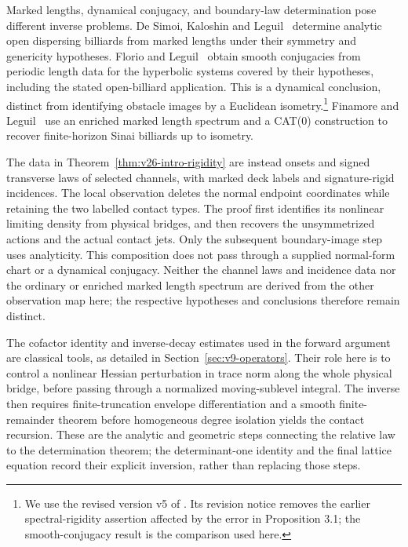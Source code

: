 Marked lengths, dynamical conjugacy, and boundary-law determination
pose different inverse problems.  De Simoi, Kaloshin and
Leguil~\cite{DSKL} determine analytic open dispersing billiards from
marked lengths under their symmetry and genericity hypotheses.
Florio and Leguil~\cite{FlorioLeguil} obtain smooth conjugacies from
periodic length data for the hyperbolic systems covered by their
hypotheses, including the stated open-billiard application.  This is a
dynamical conclusion, distinct from identifying obstacle images by a
Euclidean isometry.\footnote{We use the revised version v5 of
\cite{FlorioLeguil}.  Its revision notice removes the earlier
spectral-rigidity assertion affected by the error in Proposition 3.1;
the smooth-conjugacy result is the comparison used here.}
Finamore and Leguil~\cite{FinamoreLeguil} use an enriched marked length
spectrum and a CAT(0) construction to recover finite-horizon Sinai
billiards up to isometry.

The data in Theorem~\ref{thm:v26-intro-rigidity} are instead onsets and
signed transverse laws of selected channels, with marked deck labels
and signature-rigid incidences.  The local observation deletes the
normal endpoint coordinates while retaining the two labelled contact
types.  The proof first identifies its nonlinear limiting density from
physical bridges, and then recovers the unsymmetrized actions and the
actual contact jets.  Only the subsequent boundary-image step uses
analyticity.  This composition does not pass through a supplied
normal-form chart or a dynamical conjugacy.  Neither the channel laws
and incidence data nor the ordinary or enriched marked length spectrum
are derived from the other observation map here; the respective
hypotheses and conclusions therefore remain distinct.

The cofactor identity and inverse-decay estimates used in the forward
argument are classical tools, as detailed in
Section~\ref{sec:v9-operators}.  Their role here is to control a
nonlinear Hessian perturbation in trace norm along the whole physical
bridge, before passing through a normalized moving-sublevel integral.
The inverse then requires finite-truncation envelope differentiation
and a smooth finite-remainder theorem before homogeneous degree
isolation yields the contact recursion.  These are the analytic and
geometric steps connecting the relative law to the determination
theorem; the determinant-one identity and the final lattice equation
record their explicit inversion, rather than replacing those steps.

